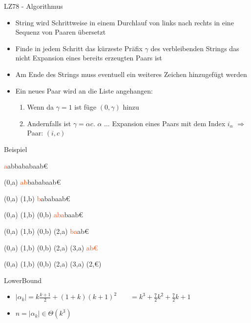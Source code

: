 \documentclass[xcolor=dvipsnames]{beamer}
\begin{document}
\begin{frame}{\FrameName}
\begin{block}{LZ78 - Algorithmus}
	\begin{itemize}[<+->]
		\item String wird Schrittweise in einem Durchlauf von links nach rechts in eine Sequenz von Paaren übersetzt
		\item Finde in jedem Schritt das kürzeste Präfix $\gamma$ des verbleibenden Strings das nicht Expansion eines bereits erzeugten Paars ist
		\item Am Ende des Strings muss eventuell ein weiteres Zeichen hinzugefügt werden
		\item Ein neues Paar wird an die Liste angehangen:
		\begin{enumerate}
			\item<4-> Wenn da $\gamma = 1$ ist füge $(0,\gamma)$ hinzu
			\item<5-> Andernfalls ist $\gamma = \alpha c$. \linebreak $\alpha$ ... Expansion eines Paars mit dem Index $i_\alpha$ \linebreak $\Rightarrow$ Paar: $(i,c)$
		\end{enumerate}
	\end{itemize}
\end{block}
\end{frame}

\newcommand{\M}[1]{\textcolor{OrangeRed}{#1}}

\begin{frame}{\FrameName}
\begin{block}{Beispiel}
	\begin{description}[<+->]
		\item \M{a}abbababaab\euro
		\item (0,a) \M{ab}bababaab\euro
		\item (0,a) (1,b) \M{b}ababaab\euro
		\item (0,a) (1,b) (0,b) \M{aba}baab\euro
		\item (0,a) (1,b) (0,b) (2,a) \M{ba}ab\euro
		\item (0,a) (1,b) (0,b) (2,a) (3,a) \M{ab\euro}
		\item (0,a) (1,b) (0,b) (2,a) (3,a) (2,\euro)
	\end{description}
\end{block}
\end{frame}

\begin{frame}{\FrameName}
\begin{block}{LowerBound}
	\begin{center}
	\end{center}
	\begin{itemize}[<+->]
		\item $|\alpha_k | = k \frac{k+1}{2} + (1+k)(k+1)^2$ \linebreak
			$\phantom{|\alpha_k |} = k^3 + \frac{7}{2}k^2 + \frac{7}{2}k + 1$
		\item $ n = |\alpha_k | \in \Theta(k^3)$
	\end{itemize}
\end{block}
\end{frame}
\end{document}

